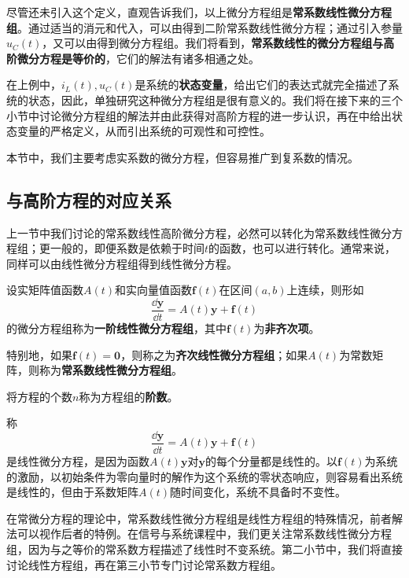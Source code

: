 尽管还未引入这个定义，直观告诉我们，以上微分方程组是\textbf{常系数线性微分方程组}。通过适当的消元和代入，可以由得到二阶常系数线性微分方程；通过引入参量$u_C(t)$，又可以由得到微分方程组。我们将看到，\textbf{常系数线性的微分方程组与高阶微分方程是等价的}，它们的解法有诸多相通之处。

在上例中，$i_L(t),u_C(t)$是系统的\textbf{状态变量}，给出它们的表达式就完全描述了系统的状态，因此，单独研究这种微分方程组是很有意义的。我们将在接下来的三个小节中讨论微分方程组的解法并由此获得对高阶方程的进一步认识，再在中给出状态变量的严格定义，从而引出系统的可观性和可控性。

本节中，我们主要考虑实系数的微分方程，但容易推广到复系数的情况。

\subsection{与高阶方程的对应关系}\label{sub:compare_to_high_order}

上一节中我们讨论的常系数线性高阶微分方程，必然可以转化为常系数线性微分方程组；更一般的，即便系数是依赖于时间$t$的函数，也可以进行转化。通常来说，同样可以由线性微分方程组得到线性微分方程。

\begin{definition}[线性微分方程组]
    设实矩阵值函数$A(t)$和实向量值函数$\mathbf{f}(t)$在区间$(a,b)$上连续，则形如
    \begin{equation}
        \frac{\dd\mathbf{y}}{\dd t}=A(t)\mathbf{y}+\mathbf{f}(t)
    \end{equation}
    的微分方程组称为\textbf{一阶线性微分方程组}，其中$\mathbf{f}(t)$为\textbf{非齐次项}。

    特别地，如果$\mathbf{f}(t)=\mathbf{0}$，则称之为\textbf{齐次线性微分方程组}；如果$A(t)$为常数矩阵，则称为\textbf{常系数线性微分方程组}。

    将方程的个数$n$称为方程组的\textbf{阶数}。
\end{definition}

称
\begin{equation}
    \frac{\dd\mathbf{y}}{\dd t}=A(t)\mathbf{y}+\mathbf{f}(t)
\end{equation}
是线性微分方程，是因为函数$A(t)\mathbf{y}$对$\mathbf{y}$的每个分量都是线性的。以$\mathbf{f}(t)$为系统的激励，以初始条件为零向量时的解作为这个系统的零状态响应，则容易看出系统是线性的，但由于系数矩阵$A(t)$随时间变化，系统不具备时不变性。

在常微分方程的理论中，常系数线性微分方程组是线性方程组的特殊情况，前者解法可以视作后者的特例。在信号与系统课程中，我们更关注常系数线性微分方程组，因为与之等价的常系数方程描述了线性时不变系统。第二小节中，我们将直接讨论线性方程组，再在第三小节专门讨论常系数方程组。

